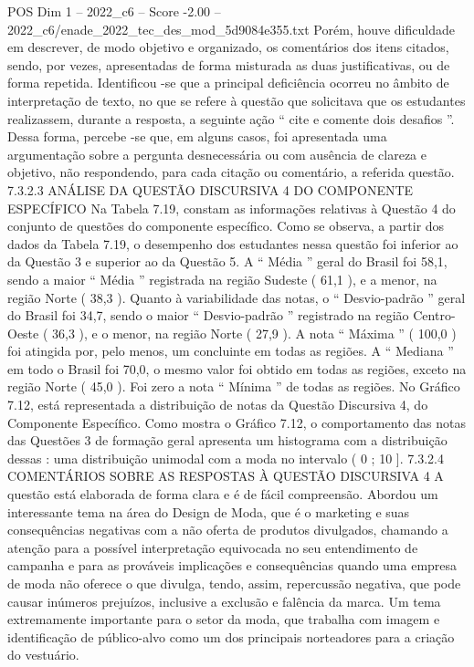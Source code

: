 \begin{textsample}{POS Dim 1 – 2022\_c6 – Score -2.00 – 2022\_c6/enade\_2022\_tec\_des\_mod\_5d9084e355.txt}
Porém, houve dificuldade em descrever, de modo objetivo e organizado, os comentários dos itens citados, sendo, por vezes, apresentadas de forma misturada as duas justificativas, ou de forma repetida.
Identificou -se que a principal deficiência ocorreu no âmbito de interpretação de texto, no que se refere à questão que solicitava que os estudantes realizassem, durante a resposta, a seguinte ação “ cite e comente dois desafios ”.
Dessa forma, percebe -se que, em alguns casos, foi apresentada uma argumentação sobre a pergunta desnecessária ou com ausência de clareza e objetivo, não respondendo, para cada citação ou comentário, a referida questão. 7.3.2.3 ANÁLISE DA QUESTÃO DISCURSIVA 4 DO COMPONENTE ESPECÍFICO Na Tabela 7.19, constam as informações relativas à Questão 4 do conjunto de questões do componente específico.
Como se observa, a partir dos dados da Tabela 7.19, o desempenho dos estudantes nessa questão foi inferior ao da Questão 3 e superior ao da Questão 5.
A “ Média ” geral do Brasil foi 58,1, sendo a maior “ Média ” registrada na região Sudeste ( 61,1 ), e a menor, na região Norte ( 38,3 ).
Quanto à variabilidade das notas, o “ Desvio-padrão ” geral do Brasil foi 34,7, sendo o maior “ Desvio-padrão ” registrado na região Centro-Oeste ( 36,3 ), e o menor, na região Norte ( 27,9 ).
A nota “ Máxima ” ( 100,0 ) foi atingida por, pelo menos, um concluinte em todas as regiões.
A “ Mediana ” em todo o Brasil foi 70,0, o mesmo valor foi obtido em todas as regiões, exceto na região Norte ( 45,0 ).
Foi zero a nota “ Mínima ” de todas as regiões.
No Gráfico 7.12, está representada a distribuição de notas da Questão Discursiva 4, do Componente Específico.
Como mostra o Gráfico 7.12, o comportamento das notas das Questões 3 de formação geral apresenta um histograma com a distribuição dessas : uma distribuição unimodal com a moda no intervalo ( 0 ; 10 ]. 7.3.2.4 COMENTÁRIOS SOBRE AS RESPOSTAS À QUESTÃO DISCURSIVA 4 A questão está elaborada de forma clara e é de fácil compreensão.
Abordou um interessante tema na área do Design de Moda, que é o marketing e suas consequências negativas com a não oferta de produtos divulgados, chamando a atenção para a possível interpretação equivocada no seu entendimento de campanha e para as prováveis implicações e consequências quando uma empresa de moda não oferece o que divulga, tendo, assim, repercussão negativa, que pode causar inúmeros prejuízos, inclusive a exclusão e falência da marca.
Um tema extremamente importante para o setor da moda, que trabalha com imagem e identificação de público-alvo como um dos principais norteadores para a criação do vestuário.

\end{textsample}
